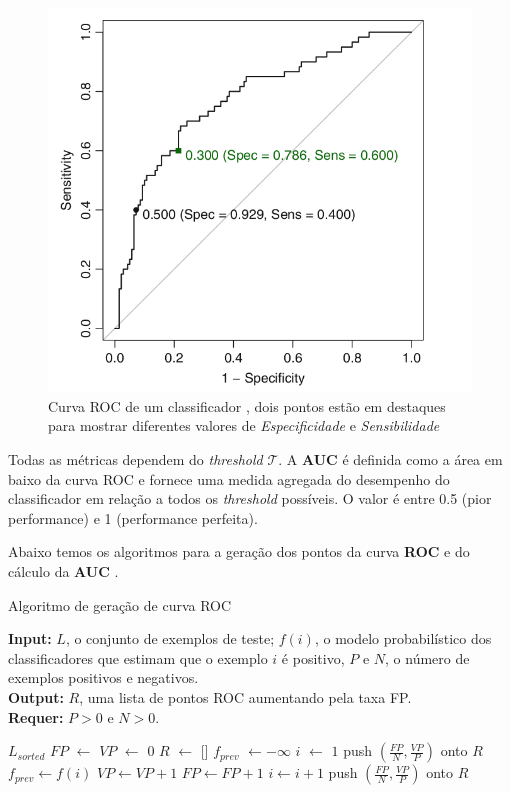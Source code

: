 \begin{figure}[H]
 \caption{Curva ROC de um classificador \cite{kuhn}, dois pontos estão em destaques para mostrar diferentes valores de \textit{Especificidade} e \textit{Sensibilidade}}
 \label{fig:roc_kuhn}
 \centering
 \includegraphics[scale=0.4]{images/roc_kuhn.png}
\end{figure}

Todas as métricas dependem do \textit{threshold} $\mathcal{T}$. A \textbf{AUC} é definida como a área em baixo da curva ROC e fornece uma medida agregada do desempenho do classificador em relação a todos os \textit{threshold} possíveis. O valor é entre 0.5 (pior performance) e 1 (performance perfeita).

Abaixo temos os algoritmos para a geração dos pontos da curva \textbf{ROC} e do cálculo da \textbf{AUC} \cite{FAWCETT2006861}.

\begin{algorithm}[H]
\caption{Algoritmo de geração de curva ROC}\label{algoritmo:roc}
\label{algo:roc}
\textbf{Input:} $L$, o conjunto de exemplos de teste; $f(i)$, o modelo probabilístico
dos classificadores que estimam que o exemplo $i$ é positivo, $P$ e $N$, o
número de exemplos positivos e negativos.\\
\textbf{Output:} $R$, uma lista de pontos ROC aumentando pela taxa FP. \\
\textbf{Requer:} $P>0$ e $N>0$. \\
\begin{algorithmic}[1]
\State $L_{sorted}$ 
\State $FP$ $\leftarrow$ $VP$ $\leftarrow$ $0$ 
\State $R$ $\leftarrow$ [] 
\State $f_{prev}$ $\leftarrow -\infty$ 
\State $i$ $\leftarrow$ $1$
\State push $(\frac{FP}{N},\frac{VP}{P})$ onto $R$
\State $f_{prev} \leftarrow f(i)$
\EndIf
{}
\State $VP \leftarrow VP + 1$
\Else
\State $FP \leftarrow FP + 1$
\EndIf
\State $i \leftarrow i + 1$
\EndWhile
\State push $(\frac{FP}{N},\frac{VP}{P})$ onto $R$
\end{algorithmic}
\end{algorithm}

